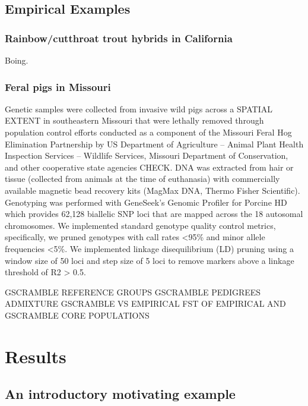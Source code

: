 \subsection*{Empirical Examples}

\subsubsection*{Rainbow/cutthroat trout hybrids in California}

Boing.

\subsubsection*{Feral pigs in Missouri}

Genetic samples were collected from invasive wild pigs across a SPATIAL EXTENT in southeastern Missouri that were lethally removed through population control efforts conducted as a component of the Missouri Feral Hog Elimination Partnership
by US Department of Agriculture – Animal Plant Health Inspection Services – Wildlife Services, Missouri Department of Conservation, and other cooperative state agencies CHECK.
DNA was extracted from hair or tissue (collected from animals at the time of euthanasia) with commercially available magnetic bead recovery kits (MagMax DNA, Thermo Fisher Scientific).
Genotyping was performed with GeneSeek’s Genomic Profiler for Porcine HD which provides 62,128 biallelic SNP loci that are mapped across the 18 autosomal chromosomes.
We implemented standard genotype quality control metrics, specifically, we pruned genotypes with call rates <95\% and minor allele frequencies <5\%.
We implemented linkage disequilibrium (LD) pruning using a window size of 50 loci and step size of 5 loci to remove markers above a linkage threshold of R2 > 0.5.

GSCRAMBLE REFERENCE GROUPS
GSCRAMBLE PEDIGREES
ADMIXTURE GSCRAMBLE VS EMPIRICAL
FST OF EMPIRICAL AND GSCRAMBLE CORE POPULATIONS






\section*{Results}

\subsection*{An introductory motivating example}

